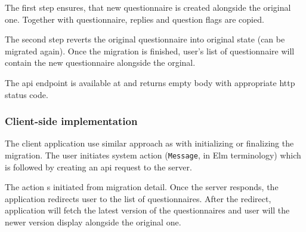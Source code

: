The first step ensures, that new questionnaire is created alongside the original one.
Together with questionnaire, replies and question flags are copied.

The second step reverts the original questionnaire into original state (can be migrated again).
Once the migration is finished, user's list of questionnaire will contain the new questionnaire alongside the orginal.

The \gls{api} endpoint is available at  and returns empty body with appropriate \gls{http} status code.

\subsubsection*{Client-side implementation}

The client application use similar approach as with initializing or finalizing the migration.
The user initiates system action (\texttt{Message}, in Elm terminology) which is followed by creating an \gls{api} request to the server.

The action s initiated from migration detail.
Once the server responds, the application redirects user to the list of questionnaires.
After the redirect, application will fetch the latest version of the questionnaires and user will the newer version display alongside the original one.
